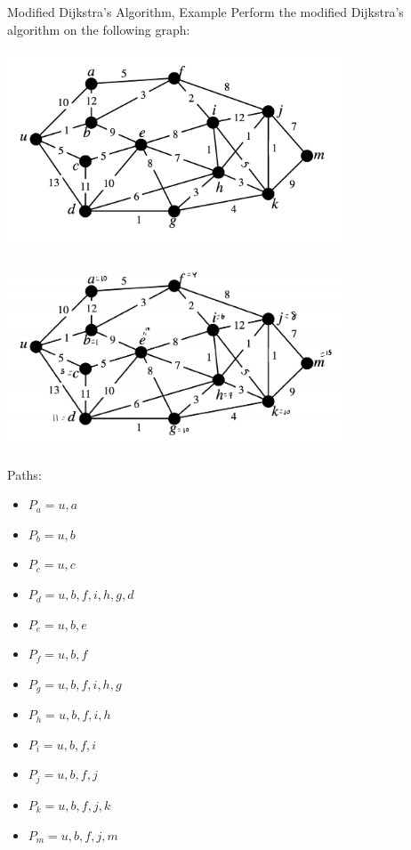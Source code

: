 \documentclass[10pt]{extarticle}
\begin{document}
  \begin{problem}{Modified Dijkstra's Algorithm, Example}
    Perform the modified Dijkstra's algorithm on the following graph:
    \begin{center}
      \includegraphics[width=10cm]{2_3_graph}
    \end{center}
    \tcblower
    \begin{center} 
      \includegraphics[width=10cm]{2_3_dijkstra}
    \end{center}
    Paths:
    \begin{multicols}{2}
    \begin{itemize}
      \item $P_a = u,a$
      \item $P_b = u,b$
      \item $P_c = u,c$
      \item $P_d = u,b,f,i,h,g,d$
      \item $P_e = u,b,e$
      \item $P_f = u,b,f$
      \item $P_g = u,b,f,i,h,g$
      \item $P_h = u,b,f,i,h$
      \item $P_i = u,b,f,i$
      \item $P_j = u,b,f,j$
      \item $P_k = u,b,f,j,k$
      \item $P_m = u,b,f,j,m$
    \end{itemize}
    \end{multicols}
  \end{problem}
\end{document}
